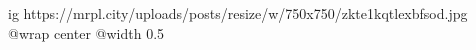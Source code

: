  
 
 
 
 

\ifcmt
  ig https://mrpl.city/uploads/posts/resize/w/750x750/zkte1kqtlexbfsod.jpg
  @wrap center
  @width 0.5
\fi
